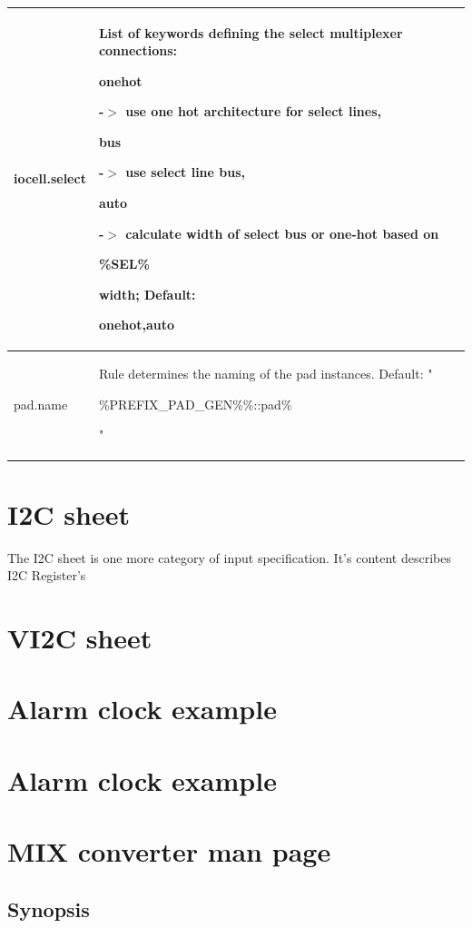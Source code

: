 \documentclass[a4paper,12pt]{article}
\begin{document}
\begin{tabular}{|p{4cm}|p{9cm}|}
\begin{tt}iocell.select\end{tt} & List of keywords defining the select multiplexer connections: \begin{tt}onehot\end{tt} -$>$ use one hot architecture for select lines, \begin{tt}bus\end{tt} -$>$ use select line bus, \begin{tt}auto\end{tt} -$>$ calculate width of select bus or one-hot based on \begin{tt}\%SEL\%\end{tt} width; Default: \begin{tt}onehot,auto\end{tt}\\\hline
\begin{tt}pad.name\end{tt} & Rule determines the naming of the pad instances. Default: "\begin{tt}\%PREFIX\_PAD\_GEN\%\%::pad\%\end{tt}" \\\hline
\end{tabular}

\section{I2C sheet}
The I2C sheet is one more category of input specification. It's content describes I2C Register's 

\section{VI2C sheet}

\section{Alarm clock example}

\section{Alarm clock example}

\section{MIX converter man page}

\subsection{Synopsis}
\end{document}
